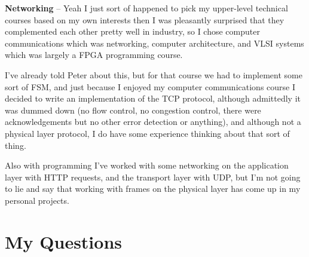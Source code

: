 \documentclass{IEEEtran}
\begin{document}
\textbf{Networking} -- Yeah I just sort of happened to pick my upper-level technical courses based on my own interests then I was pleasantly surprised that they complemented each other pretty well in industry, so I chose computer communications which was networking, computer architecture, and VLSI systems which was largely a FPGA programming course. 

I've already told Peter about this, but for that course we had to implement some sort of FSM, and just because I enjoyed my computer communications course I decided to write an implementation of the TCP protocol, although admittedly it was dummed down (no flow control, no congestion control, there were acknowledgements but no other error detection or anything), and although not a physical layer protocol, I do have some experience thinking about that sort of thing. 

Also with programming I've worked with some networking on the application layer with HTTP requests, and the transport layer with UDP, but I'm not going to lie and say that working with frames on the physical layer has come up in my personal projects.

\section{My Questions}
\end{document}
